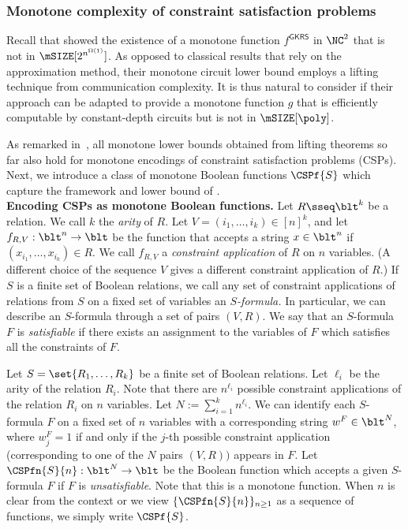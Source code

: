 \documentclass[11pt]{article}
\begin{document}
\subsubsection{Monotone complexity of constraint satisfaction problems}
\label{sec:intro_mon_csp}

Recall that 
\citep{gkrs19} 
showed the existence of a monotone function $f^{\mathsf{GKRS}}$ in $\NC^2$ that is not in $\mSIZE[2^{n^{\Omega(1)}}]$. As opposed to classical results \citep{razborov1985lower, andreev1985method, DBLP:journals/combinatorica/AlonB87, tardos_1988} that rely on the approximation method, their monotone circuit lower bound employs a  lifting technique from communication complexity. It is thus natural to consider if their approach can be adapted to provide a monotone function $g$ that is efficiently computable by constant-depth circuits but is not in $\mSIZE[\poly]$. 

As remarked in~\cite{gkrs19,DBLP:journals/sigact/RezendeGR22}, all
monotone lower bounds 
obtained from lifting theorems so far 
also hold for monotone encodings of constraint satisfaction problems (CSPs). 
Next, we introduce a class of monotone Boolean functions $\CSPf{S}$ which
capture the framework and lower bound of \citep{gkrs19}.\\

\noindent \textbf{Encoding CSPs as monotone Boolean functions.} Let $R \sseq \blt^k$ be a relation.
We call $k$ the \emph{arity} of $R$.
Let
$V = (i_1,\dots,i_k) \in [n]^k$,
and 
let
$f_{R,V}: \blt^n \to \blt$
be
the function 
that
accepts a string $x \in \blt^n$
if $(x_{i_1},\dots,x_{i_k}) \in R$.
We call $f_{R,V}$ a \emph{constraint application} of $R$ on $n$ variables.
(A different choice of the sequence $V$
gives a different constraint application of $R$.)
If $S$ is a finite set of Boolean relations,
we call any set of constraint applications of relations from $S$
on a fixed set of variables
an \emph{$S$-formula.}
In particular, we can describe an $S$-formula through a set of pairs $(V,R)$.
We say that an $S$-formula $F$ is \emph{satisfiable}
if there exists an assignment to the variables of $F$
which satisfies all the constraints of $F$.

Let $S = \set{R_1,\dots,R_k}$ be a finite set of Boolean relations.
Let $\ell_i$ be the arity of the relation $R_i$.
Note that there are $n^{\ell_i}$ possible constraint applications
of the relation $R_i$ on $n$ variables.
Let
$N := \sum_{i=1}^k n^{\ell_i}$.
We can identify each 
$S$-formula $F$
on a fixed set of $n$ variables 
with a corresponding string $w^F \in \blt^N$, where $w^F_j = 1$ if and only if the $j$-th possible constraint application (corresponding to one of the $N$ pairs $(V,R))$ appears in $F$.
Let $\CSPfn{S}{n} : \blt^N \to \blt$
be the Boolean function which accepts a given 
$S$-formula $F$ if $F$ is \emph{unsatisfiable}.
Note that this is a monotone function.
When $n$ is clear from the context or we view $\{\CSPfn{S}{n}\}_{n \geq 1}$ as a sequence of functions, we simply write
$\CSPf{S}$.\\
\end{document}
